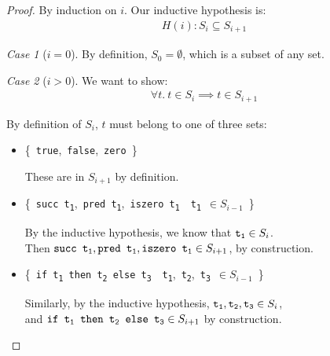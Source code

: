 \documentclass{article}
\newcommand{\set}[1]{\{\ #1\ \}}
\newcommand{\comp}[2]{\set{#1\ \mid\ #2}}
\newcommand{\term}[1]{\texttt{t\textsubscript{#1}}}
\newcommand{\ms}[1]{\texttt{#1}}
\theoremstyle{remark}
\newtheorem*{case}{Case}
\begin{document}
    \begin{proof}
        By induction on $i$. Our inductive hypothesis is:
        \begin{align*}
            H(i): S_i \subseteq S_{i + 1}
        \end{align*}

        \begin{case}[$i = 0$]
            By definition, $S_0 = \emptyset$, which is a subset of any set.
        \end{case}

        \begin{case}[$i > 0$]
            We want to show:
            \begin{align*}
                \forall t.\ t \in S_i \implies t \in S_{i + 1}
            \end{align*}

            By definition of $S_i$, $t$ must belong to one of three sets:

            \begin{itemize}
                \item{\set{\ms{true},\ \ms{false},\ \ms{zero}}}

                These are in $S_{i + 1}$ by definition.

                \item{\comp{\ms{succ \term{1}},\ \ms{pred \term{1}},\ \ms{iszero \term{1}}}{\term{1}\ $\in S_{i - 1}$}}

                By the inductive hypothesis, we know that $\term{1} \in S_i$.\\
                Then $\ms{succ \term{1}}, \ms{pred \term{1}}, \ms{iszero \term{1}} \in S_{i + 1}$, by construction.

                \item{\comp{\ms{if \term{1} then \term{2} else \term{3}}}{\term{1},\ \term{2},\ \term{3}\ $\in S_{i - 1}$}}

                Similarly, by the inductive hypothesis, $\term{1}, \term{2}, \term{3} \in S_i$,\\
                and $\ms{if \term{1} then \term{2} else \term{3}} \in S_{i + 1}$ by construction.
            \end{itemize}
        \end{case}
    \end{proof}
\end{document}
